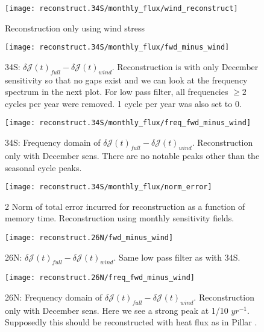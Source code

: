 \documentclass[a4paper,11pt]{article}
\begin{document}
   \begin{figure}
    \centering
    \texttt{[image: reconstruct.34S/monthly\_flux/wind\_reconstruct]}
    \caption{Reconstruction only using wind stress}
    \label{fig:windReconstruct}
   \end{figure}

   \begin{figure}
    \centering
    \texttt{[image: reconstruct.34S/monthly\_flux/fwd\_minus\_wind]}
    \caption{34S: $\delta\mathcal{J}(t)_{full} - \delta\mathcal{J}(t)_{wind}$. Reconstruction is with only December sensitivity so that no gaps exist and we can look at the frequency spectrum in the next plot. For low pass filter, all frequencies $\geq2$ cycles per year were removed. 1 cycle per year was also set to 0. }
    \label{fig:windRecError}
   \end{figure}

   \begin{figure}
    \centering
    \texttt{[image: reconstruct.34S/monthly\_flux/freq\_fwd\_minus\_wind]}
    \caption{34S: Frequency domain of $\delta\mathcal{J}(t)_{full} - \delta\mathcal{J}(t)_{wind}$. Reconstruction only with December sens. There are no notable peaks other than the seasonal cycle peaks.}
    \label{fig:freqWindRecError}
   \end{figure}

   \begin{figure}
    \centering
    \texttt{[image: reconstruct.34S/monthly\_flux/norm\_error]}
    \caption{2 Norm of total error incurred for reconstruction as a function of memory time. Reconstruction using monthly sensitivity fields.}
    \label{fig:reconstructError}
   \end{figure}

   \begin{figure}
    \centering
    \texttt{[image: reconstruct.26N/fwd\_minus\_wind]}
    \caption{26N: $\delta\mathcal{J}(t)_{full} - \delta\mathcal{J}(t)_{wind}$. Same low pass filter as with 34S.}
    \label{fig:windRecError26N}
   \end{figure}

   \begin{figure}
    \centering
    \texttt{[image: reconstruct.26N/freq\_fwd\_minus\_wind]}
    \caption{26N: Frequency domain of $\delta\mathcal{J}(t)_{full} - \delta\mathcal{J}(t)_{wind}$. Reconstruction only with December sens. Here we see a strong peak at 1/10 $yr^{-1}$. Supposedly this should be reconstructed with heat flux as in Pillar \cite{pillarAttribution}.}
    \label{fig:freqWindRecError26N}
   \end{figure}
\end{document}
